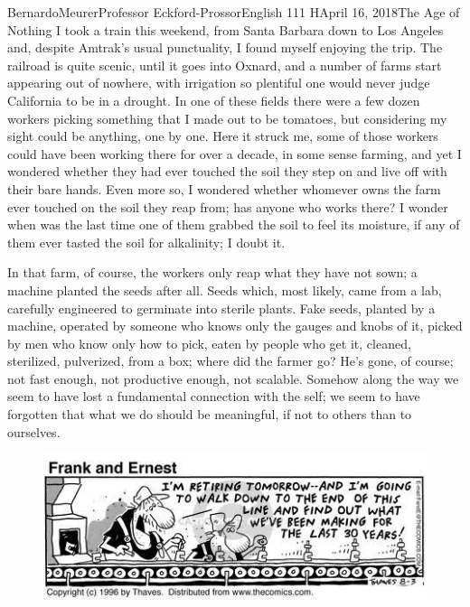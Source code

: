 \documentclass[12pt,letterpaper]{article}
\begin{document}
\begin{mla}{Bernardo}{Meurer}{Professor Eckford-Prossor}{English 111 H}{April 16, 2018}{The Age of Nothing}
    I took a train this weekend, from Santa Barbara down to Los Angeles and, despite Amtrak's usual punctuality, I found myself enjoying the trip. The railroad is quite scenic, until it goes into Oxnard, and a number of farms start appearing out of nowhere, with irrigation so plentiful one would never judge California to be in a drought. In one of these fields there were a few dozen workers picking something that I made out to be tomatoes, but considering my sight could be anything, one by one. Here it struck me, some of those workers could have been working there for over a decade, in some sense farming, and yet I wondered whether they had ever touched the soil they step on and live off with their bare hands. Even more so, I wondered whether whomever owns the farm ever touched on the soil they reap from; has anyone who works there? I wonder when was the last time one of them grabbed the soil to feel its moisture, if any of them ever tasted the soil for alkalinity; I doubt it.

    In that farm, of course, the workers only reap what they have not sown; a machine planted the seeds after all. Seeds which, most likely, came from a lab, carefully engineered to germinate into sterile plants. Fake seeds, planted by a machine, operated by someone who knows only the gauges and knobs of it, picked by men who know only how to pick, eaten by people who get it, cleaned, sterilized, pulverized, from a box; where did the farmer go? He's gone, of course; not fast enough, not productive enough, not scalable. Somehow along the way we seem to have lost a fundamental connection with the self; we seem to have forgotten that what we do should be meaningful, if not to others than to ourselves.

    \begin{figure}[H]
        \centering
        \includegraphics{assembly.jpg}
    \end{figure}


\end{mla}
\end{document}
